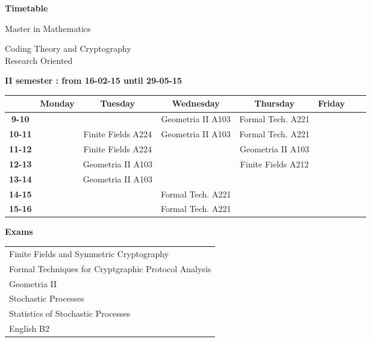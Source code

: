 \documentclass{article}
\begin{document}
\begin{landscape}

\begin{center}
\begin{huge}
	\textbf{Timetable}\\
\end{huge}
\bigskip
\begin{Large}
Master in Mathematics \\
\end{Large}
\begin{large}
Coding Theory and Cryptography\\
Research Oriented
\end{large}
\end{center}


\begin{center}
\textbf{II semester : from 16-02-15 until 29-05-15}
\end{center}

\begin{table}[ht]
\centering
\begin{tabular}{|c|c|c|c|c|c|c|c|}\hline
& \textbf{Monday} & \textbf{Tuesday} & \textbf{Wednesday} & \textbf{Thursday} & \textbf{Friday}\\ \hline
\textbf{9-10} & & & Geometria II A103& Formal Tech. A221& \\ \hline
\textbf{10-11} & & Finite Fields A224 & Geometria II A103 & Formal Tech. A221& \\ \hline
\textbf{11-12} & & Finite Fields A224 & & Geometria II A103& \\ \hline
\textbf{12-13} & & Geometria II A103 & & Finite Fields A212 & \\ \hline
\textbf{13-14} & & Geometria II A103 & & & \\ \hline
\textbf{14-15} & & & Formal Tech. A221 & & \\ \hline
\textbf{15-16} & & & Formal Tech. A221 & & \\ \hline
\end{tabular}
\end{table}

\textbf{Exams}\\
\begin{table}[ht]
\begin{tabular}{l}
	Finite Fields and Symmetric Cryptography\\
	Formal Techniques for Cryptgraphic Protocol Analysis\\
	Geometria II\\
	Stochastic Processes\\
	Statistics of Stochastic Processes\\
	English B2\\
\end{tabular}
\end{table}

\end{landscape}
\end{document}
